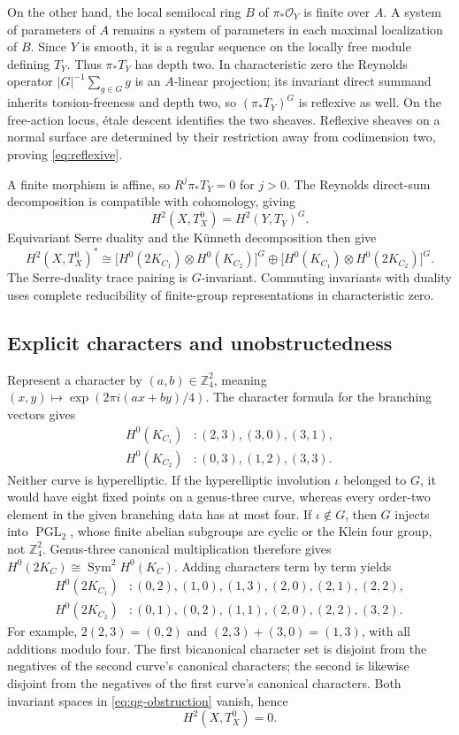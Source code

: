 \documentclass[a4paper,11pt]{article}
\numberwithin{equation}{section}
\theoremstyle{definition}
\newcommand{\Z}{\mathbb Z}
\begin{document}
On the other hand, the local semilocal ring $B$ of $\pi_*\mathcal O_Y$ is finite over $A$.
A system of parameters of $A$ remains a system of parameters in each maximal localization of $B$.
Since $Y$ is smooth, it is a regular sequence on the locally free module defining $T_Y$.
Thus $\pi_*T_Y$ has depth two. In characteristic zero the Reynolds operator
$|G|^{-1}\sum_{g\in G}g$ is an $A$-linear projection;
its invariant direct summand inherits torsion-freeness and depth two, so $(\pi_*T_Y)^G$ is reflexive as well.
On the free-action locus, \'etale descent identifies the two sheaves. Reflexive sheaves on a normal surface are determined by their restriction away from codimension two,
proving \eqref{eq:reflexive}.

A finite morphism is affine, so $R^j\pi_*T_Y=0$ for $j>0$.
The Reynolds direct-sum decomposition is compatible with cohomology, giving
\[
H^2(X,T_X^0)=H^2(Y,T_Y)^G.
\]
Equivariant Serre duality and the K\"unneth decomposition then give
\begin{equation}\label{eq:qg-obstruction}
H^2(X,T_X^0)^*\cong
\bigl[H^0(2K_{C_1})\otimes H^0(K_{C_2})\bigr]^G
\oplus
\bigl[H^0(K_{C_1})\otimes H^0(2K_{C_2})\bigr]^G.
\end{equation}
The Serre-duality trace pairing is $G$-invariant. Commuting invariants with duality uses complete reducibility of finite-group representations in characteristic zero.

\subsection{Explicit characters and unobstructedness}
Represent a character by $(a,b)\in\Z_4^2$, meaning
$(x,y)\mapsto\exp(2\pi i(ax+by)/4)$.
The character formula for the branching vectors gives
\[
\begin{aligned}
H^0(K_{C_1}) &: (2,3),(3,0),(3,1),\\
H^0(K_{C_2}) &: (0,3),(1,2),(3,3).
\end{aligned}
\]
Neither curve is hyperelliptic. If the hyperelliptic involution $\iota$ belonged to $G$,
it would have eight fixed points on a genus-three curve, whereas every order-two element in the given branching data has at most four.
If $\iota\notin G$, then $G$ injects into $\operatorname{PGL}_2$, whose finite abelian subgroups are cyclic or the Klein four group, not $\Z_4^2$.
Genus-three canonical multiplication therefore gives
$H^0(2K_C)\cong\operatorname{Sym}^2H^0(K_C)$.
Adding characters term by term yields
\[
\begin{aligned}
H^0(2K_{C_1}) &: (0,2),(1,0),(1,3),(2,0),(2,1),(2,2),\\
H^0(2K_{C_2}) &: (0,1),(0,2),(1,1),(2,0),(2,2),(3,2).
\end{aligned}
\]
For example, $2(2,3)=(0,2)$ and $(2,3)+(3,0)=(1,3)$, with all additions modulo four.
The first bicanonical character set is disjoint from the negatives of the second curve's canonical characters;
the second is likewise disjoint from the negatives of the first curve's canonical characters.
Both invariant spaces in \eqref{eq:qg-obstruction} vanish, hence
\begin{equation}\label{eq:H2zero}
H^2(X,T_X^0)=0.
\end{equation}
\end{document}
